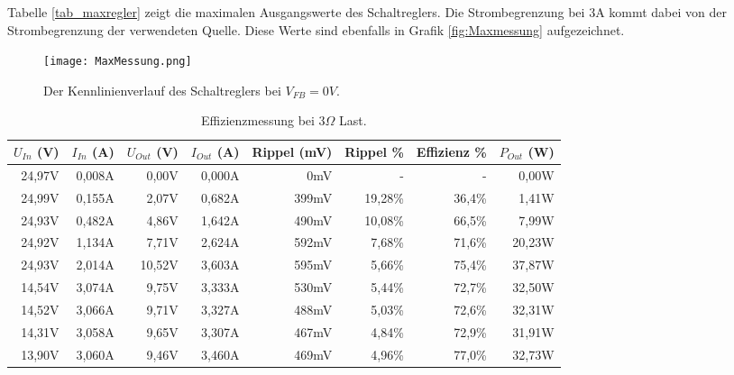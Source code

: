 Tabelle \ref{tab_maxregler} zeigt die maximalen Ausgangswerte des Schaltreglers. Die Strombegrenzung bei 3A kommt dabei von der Strombegrenzung der verwendeten Quelle. Diese Werte sind ebenfalls in Grafik \ref{fig:Maxmessung} aufgezeichnet.

\begin{figure}[h!]
	\centering
		\texttt{[image: MaxMessung.png]}
	\caption{Der Kennlinienverlauf des Schaltreglers bei $V_{FB}=0V$.}
	\label{fig:MaxMessung}
\end{figure}

\newpage

\begin{table}[h]
\centering
\begin{tabular}{|r|r|r|r|r|r|r|r|}
\hline
$U_{In}$ (V) & $I_{In}$ (A) & $U_{Out}$ (V) & $I_{Out}$ (A) & Rippel (mV) & Rippel \% & Effizienz \% & $P_{Out}$ (W) \\ \hline
24,97V   & 0,008A   & 0,00V        & 0,000A        & 0mV           & -         & -            & 0,00W      \\ \hline
24,99V   & 0,155A   & 2,07V    & 0,682A    & 399mV         & 19,28\%     & 36,4\%         & 1,41W   \\ \hline
24,93V   & 0,482A   & 4,86V    & 1,642A    & 490mV         & 10,08\%     & 66,5\%         & 7,99W   \\ \hline
24,92V   & 1,134A   & 7,71V     & 2,624A    & 592mV         & 7,68\%      & 71,6\%         & 20,23W  \\ \hline
24,93V   & 2,014A   & 10,52V    & 3,603A      & 595mV         & 5,66\%      & 75,4\%         & 37,87W  \\ \hline
14,54V   & 3,074A   & 9,75V     & 3,333A    & 530mV         & 5,44\%      & 72,7\%         & 32,50W  \\ \hline
14,52V   & 3,066A   & 9,71V     & 3,327A    & 488mV         & 5,03\%      & 72,6\%         & 32,31W  \\ \hline
14,31V   & 3,058A   & 9,65V     & 3,307A    & 467mV         & 4,84\%      & 72,9\%         & 31,91W  \\ \hline
13,90V    & 3,060A    & 9,46V     & 3,460A     & 469mV         & 4,96\%      & 77,0\%         & 32,73W  \\ \hline
\end{tabular}
\caption{Effizienzmessung bei 3$\Omega$ Last.}
\label{fig::Res3}
\end{table}

